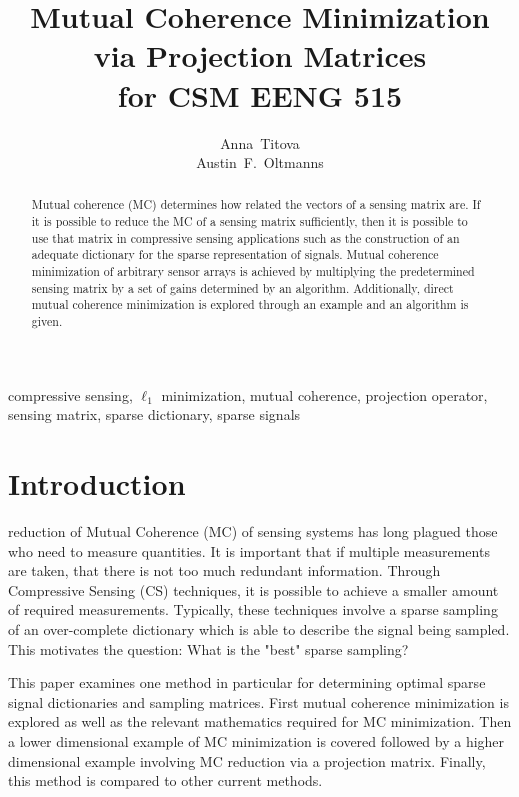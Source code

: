 \documentclass[journal]{IEEEtran}
\begin{document}
\title{Mutual Coherence Minimization \\via Projection Matrices\\ for CSM EENG 515}


\author{ 
Anna~Titova \\
Austin~F.~Oltmanns%
}

\maketitle


\begin{abstract}
Mutual coherence (MC) determines how related the vectors of a sensing matrix are. 
If it is possible to reduce the MC of a sensing matrix sufficiently, then it is
possible to use that matrix in compressive sensing applications such as the
construction of an adequate dictionary for the sparse representation of signals.
Mutual coherence minimization of arbitrary sensor arrays is achieved 
by multiplying the predetermined sensing matrix by a set of gains
determined by an algorithm. Additionally, direct mutual coherence minimization is explored
through an example and an algorithm is given.
\end{abstract}
\begin{IEEEkeywords} compressive sensing,  $\ell_1$ minimization, mutual coherence, projection operator,
sensing matrix, sparse dictionary, sparse signals
\end{IEEEkeywords}

\section{Introduction}
 reduction of Mutual Coherence (MC) of sensing systems has long plagued
those who need to measure quantities. It is important that if multiple measurements
are taken, that there is not too much redundant information.
Through Compressive Sensing (CS) techniques, it is possible to achieve
a smaller amount of required measurements. Typically, these techniques involve a sparse
sampling of an over-complete dictionary which is able to describe the signal being sampled. This 
motivates the question: What is the "best" sparse sampling?

This paper examines one method in particular for determining optimal sparse signal 
dictionaries and sampling matrices. First mutual coherence minimization is explored as well
as the relevant mathematics required for MC minimization. Then a lower dimensional example
of MC minimization is covered followed by a higher dimensional example involving MC reduction
via a projection matrix. Finally, this method is compared to other current methods.
\end{document}
